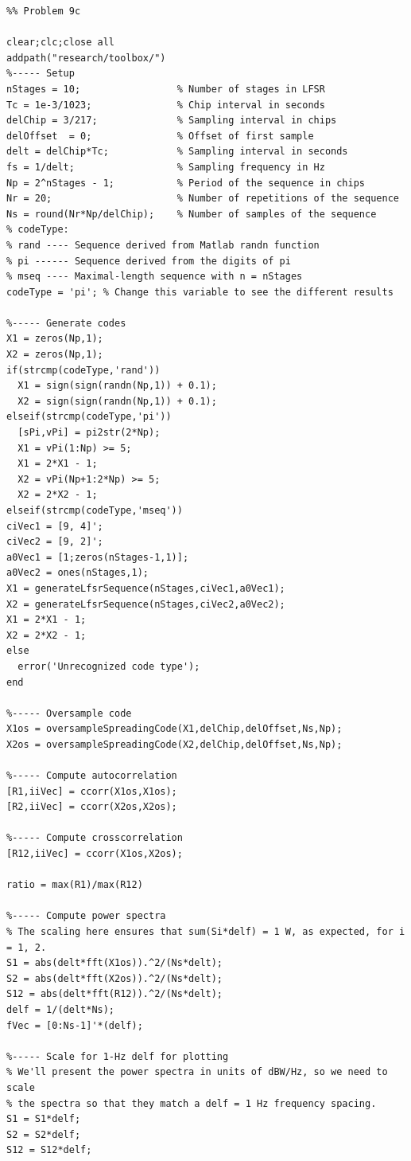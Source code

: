 \begin{lstlisting}
%% Problem 9c

clear;clc;close all
addpath("research/toolbox/")
%----- Setup
nStages = 10;                 % Number of stages in LFSR
Tc = 1e-3/1023;               % Chip interval in seconds
delChip = 3/217;              % Sampling interval in chips
delOffset  = 0;               % Offset of first sample
delt = delChip*Tc;            % Sampling interval in seconds
fs = 1/delt;                  % Sampling frequency in Hz
Np = 2^nStages - 1;           % Period of the sequence in chips
Nr = 20;                      % Number of repetitions of the sequence
Ns = round(Nr*Np/delChip);    % Number of samples of the sequence 
% codeType:
% rand ---- Sequence derived from Matlab randn function
% pi ------ Sequence derived from the digits of pi
% mseq ---- Maximal-length sequence with n = nStages
codeType = 'pi'; % Change this variable to see the different results

%----- Generate codes
X1 = zeros(Np,1);
X2 = zeros(Np,1);
if(strcmp(codeType,'rand'))
  X1 = sign(sign(randn(Np,1)) + 0.1);
  X2 = sign(sign(randn(Np,1)) + 0.1);
elseif(strcmp(codeType,'pi'))
  [sPi,vPi] = pi2str(2*Np);
  X1 = vPi(1:Np) >= 5;
  X1 = 2*X1 - 1;
  X2 = vPi(Np+1:2*Np) >= 5;
  X2 = 2*X2 - 1;
elseif(strcmp(codeType,'mseq'))
ciVec1 = [9, 4]';  
ciVec2 = [9, 2]';
a0Vec1 = [1;zeros(nStages-1,1)];
a0Vec2 = ones(nStages,1);
X1 = generateLfsrSequence(nStages,ciVec1,a0Vec1);
X2 = generateLfsrSequence(nStages,ciVec2,a0Vec2);
X1 = 2*X1 - 1;
X2 = 2*X2 - 1;
else
  error('Unrecognized code type');
end

%----- Oversample code
X1os = oversampleSpreadingCode(X1,delChip,delOffset,Ns,Np);
X2os = oversampleSpreadingCode(X2,delChip,delOffset,Ns,Np);

%----- Compute autocorrelation 
[R1,iiVec] = ccorr(X1os,X1os);
[R2,iiVec] = ccorr(X2os,X2os);

%----- Compute crosscorrelation 
[R12,iiVec] = ccorr(X1os,X2os);

ratio = max(R1)/max(R12)

%----- Compute power spectra
% The scaling here ensures that sum(Si*delf) = 1 W, as expected, for i = 1, 2.
S1 = abs(delt*fft(X1os)).^2/(Ns*delt);
S2 = abs(delt*fft(X2os)).^2/(Ns*delt);
S12 = abs(delt*fft(R12)).^2/(Ns*delt);
delf = 1/(delt*Ns);
fVec = [0:Ns-1]'*(delf);

%----- Scale for 1-Hz delf for plotting
% We'll present the power spectra in units of dBW/Hz, so we need to scale
% the spectra so that they match a delf = 1 Hz frequency spacing.
S1 = S1*delf;
S2 = S2*delf;
S12 = S12*delf;


\end{lstlisting}
